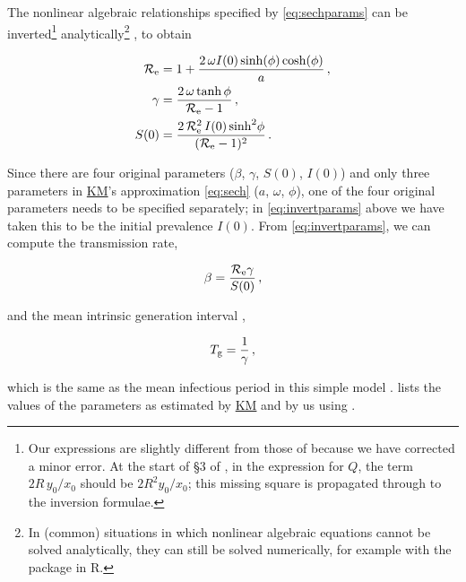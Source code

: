 \documentclass[]{interact}\usepackage[]{graphicx}\usepackage[]{xcolor}
\theoremstyle{plain}%
\theoremstyle{definition}
\theoremstyle{remark}
\newcommand{\R}{{\mathcal R}}
\newcommand{\Tg}{T_{\rm g}}
\newcommand{\Reff}{\R_{\rm e}}
\newcommand{\KM}{\protect\hyperlink{cite.KermMcKe27}{KM}\xspace}
\newcommand{\code}[1]{\texttt{\detokenize{#1}}}
\newcommand{\Sinit}{S(0)}
\newcommand{\Iinit}{I(0)}
\begin{document}
\FloatBarrier

The nonlinear algebraic relationships specified by
\cref{eq:sechparams} can be inverted\footnote{Our expressions are
  slightly different from those of 
  \citet[eq.~(3)]{bacaermodel2012} because we have corrected a minor
  error.  At the start of \S3 of \citet{bacaermodel2012}, in the
  expression for $Q$, the term $2R\,y_0/x_0$ should be $2R^2y_0/x_0$;
  this missing square is propagated through to the inversion formulae.}
analytically\footnote{In (common) situations in which nonlinear
  algebraic equations cannot be solved analytically, they can still be
  solved numerically, for example with the \code{nleqslv} package in
  R.} \citep[\S3]{bacaermodel2012}, to obtain
\begin{linenomath*}
\begin{subequations}\label{eq:invertparams}
\begin{align}
  \Reff &= 1 + \frac{2\, \omega \Iinit \sinh(\phi) \cosh(\phi)}{a} \,,
          \label{eq:Reff} \\
  \gamma &= \frac{2\,\omega\tanh{\phi}}{\Reff-1} \,, \label{eq:gamma} \\
  \Sinit &= \frac{2\,\Reff^2\,\Iinit \sinh^2\!{\phi}}{(\Reff-1)^2} \,. %
      \label{eq:S0}
\end{align}
\end{subequations}
\end{linenomath*}
Since there are four original parameters ($\beta$, $\gamma$, $\Sinit$,
$\Iinit$) and only three parameters in \KM's approximation
\eqref{eq:sech} ($a$, $\omega$, $\phi$), one of the four original
parameters needs to be specified separately; in
\cref{eq:invertparams} above we have taken this to be the initial
prevalence $\Iinit$.  From \cref{eq:invertparams}, we can compute the
transmission rate,
\begin{linenomath*}
\begin{equation}\label{eq:beta}
  \beta = \frac{\Reff\gamma}{\Sinit} \,,
\end{equation}
\end{linenomath*}
and the mean intrinsic generation interval \citep{ChamDush15},
\begin{linenomath*}
\begin{equation}\label{eq:Tg}
  \Tg = \frac{1}{\gamma} \,,
\end{equation}
\end{linenomath*}
which is the same as the mean infectious period in this simple model
\citep{pybus2001epidemic,roberts2007model,wallinga2007generation,KrylEarn13,Cham+18}.   lists the values of
the parameters as estimated by \KM and by us using \code{nls}.
\end{document}
